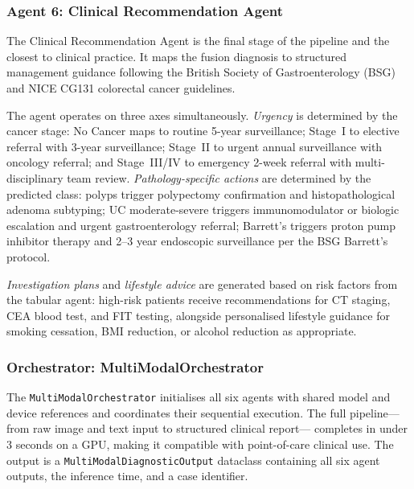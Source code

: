 \documentclass[conference]{IEEEtran}
\begin{document}
\subsubsection{Agent 6: Clinical Recommendation Agent}

The Clinical Recommendation Agent is the final stage of the pipeline and
the closest to clinical practice. It maps the fusion diagnosis to structured
management guidance following the British Society of Gastroenterology (BSG)
and NICE CG131 colorectal cancer guidelines.

The agent operates on three axes simultaneously. \emph{Urgency} is determined
by the cancer stage: No Cancer maps to routine 5-year surveillance; Stage~I
to elective referral with 3-year surveillance; Stage~II to urgent annual
surveillance with oncology referral; and Stage~III/IV to emergency 2-week
referral with multi-disciplinary team review. \emph{Pathology-specific actions}
are determined by the predicted class: polyps trigger polypectomy confirmation
and histopathological adenoma subtyping; UC moderate-severe triggers
immunomodulator or biologic escalation and urgent gastroenterology referral;
Barrett's triggers proton pump inhibitor therapy and 2--3 year endoscopic
surveillance per the BSG Barrett's protocol.

\emph{Investigation plans} and \emph{lifestyle advice} are generated based
on risk factors from the tabular agent: high-risk patients receive
recommendations for CT staging, CEA blood test, and FIT testing, alongside
personalised lifestyle guidance for smoking cessation, BMI reduction, or
alcohol reduction as appropriate.

\subsubsection{Orchestrator: MultiModalOrchestrator}

The \texttt{MultiModalOrchestrator} initialises all six agents with shared
model and device references and coordinates their sequential execution. The
full pipeline---from raw image and text input to structured clinical report---
completes in under 3 seconds on a GPU, making it compatible with point-of-care
clinical use. The output is a \texttt{MultiModalDiagnosticOutput} dataclass
containing all six agent outputs, the inference time, and a case identifier.
\end{document}
